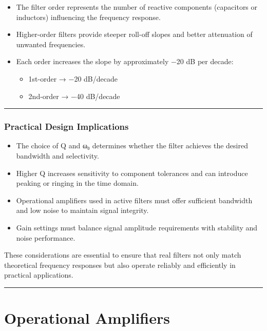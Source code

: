 \documentclass[
  letterpaper,
  DIV=11,
  numbers=noendperiod]{scrreprt}
\providecommand{\tightlist}{%
  \setlength{\itemsep}{0pt}\setlength{\parskip}{0pt}}
\begin{document}
\begin{itemize}
\tightlist
\item
  The filter order represents the number of reactive components
  (capacitors or inductors) influencing the frequency response.
\item
  Higher-order filters provide steeper roll-off slopes and better
  attenuation of unwanted frequencies.
\item
  Each order increases the slope by approximately −20 dB per decade:

  \begin{itemize}
  \tightlist
  \item
    1st-order → −20 dB/decade
  \item
    2nd-order → −40 dB/decade
  \end{itemize}
\end{itemize}

\begin{center}\rule{0.5\linewidth}{0.5pt}\end{center}

\subsection{Practical Design
Implications}\label{practical-design-implications}

\begin{itemize}
\tightlist
\item
  The choice of Q and ω₀ determines whether the filter achieves the
  desired bandwidth and selectivity.
\item
  Higher Q increases sensitivity to component tolerances and can
  introduce peaking or ringing in the time domain.
\item
  Operational amplifiers used in active filters must offer sufficient
  bandwidth and low noise to maintain signal integrity.
\item
  Gain settings must balance signal amplitude requirements with
  stability and noise performance.
\end{itemize}

These considerations are essential to ensure that real filters not only
match theoretical frequency responses but also operate reliably and
efficiently in practical applications.

\begin{center}\rule{0.5\linewidth}{0.5pt}\end{center}

\chapter{Operational Amplifiers}\label{operational-amplifiers}
\end{document}
